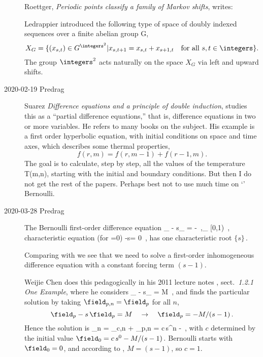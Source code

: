 \begin{description}
Roettger,
{\em Periodic points classify a family of Markov shifts}, writes:

Ledrappier introduced the following type of space of doubly indexed
sequences over a finite abelian group G,
\[
X_G=\{(x_{s,t}) \in G^{\integers^2} | x_{s,t+1}=x_{s,t}+x_{s+1,t}
\quad \mbox{for all }s,t\in \integers\}.
\]
The group $\integers^2$ acts naturally on the space $X_G$ via left and
upward shifts.

\item[2020-02-19 Predrag]
Suarez
{\em Difference equations and a principle of double induction},
studies this as a ``partial difference equations,'' that is, difference
equations in two or more variables. He refers to many books on the
subject. His example is a first order hyperbolic equation, with initial
conditions on space and time axes, which describes some thermal
properties,
\[
f(r, m) =f(r, m-1) +f(r-1, m).
\]
The goal is to calculate, step by step, all the values of the temperature
T(m,n), starting with the initial and boundary conditions. But then I do
not get the rest of the papers. Perhaps best not to use much time on
`\spt' Bernoulli.

    \item[2020-03-28 Predrag]
The Bernoulli %
first-order difference equation
\beq
\field_{\zeit} - {s}\field_{} = - \Ssym{\zeit}
\,,\qquad  \field_{\zeit} \in [0,1)
\,,
{characteristic equation} (for \Ssym{\zeit}=0)
\beq
\ExpaEig -s= 0
\,,
has one characteristic root
\(
\{s\}
\,.
\)

Comparing with  we see that we need to solve
a first-order inhomogeneous difference equation with a constant forcing
term $(s-1)$.

Weijie Chen does this pedagogically in his 2011 lecture notes
, sect.~{\em 1.2.1 One Example}, where he
considers
\beq
\field_{\zeit} - {s}\field_{} = {M}
\,,
and finds the particular solution by taking
$\field_{p,n} = \field_{p}$ for all $n$,
\[
  \field_{p}-s\,\field_{p}={M}
  \quad \to \quad
  \field_{p} = -{M}/(s-1)
\,.
\]
Hence the solution is
\beq
\field_{n} = \field_{c,n} + \field_{p,n}
= c\,s^{n} - 
\,,
with $c$ determined by the initial value
\(
\field_{0}= c\,{s}^{0} - {{M}}/(s-1)
\,.
\)
Bernoulli starts with $\field_{0}=0$, and according to
, $M=(s-1)$, so $c=1$.


\end{description}
